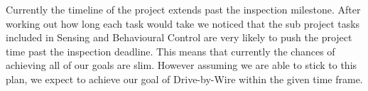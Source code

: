 Currently the timeline of the project extends past the inspection milestone.
After working out how long each task would take we noticed that the sub project
tasks included in Sensing and Behavioural Control are very likely to push the
project time past the inspection deadline. This means that currently the chances
of achieving all of our goals are slim. However assuming we are able to stick to 
this plan, we expect to achieve our goal of Drive-by-Wire within the given
time frame.

